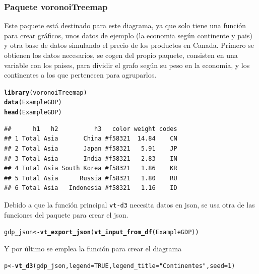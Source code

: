 \documentclass{article}\usepackage[]{graphicx}\usepackage[]{color}
\makeatletter
\newcommand{\hlnum}[1]{\textcolor[rgb]{0.686,0.059,0.569}{#1}}%
\newcommand{\hlstr}[1]{\textcolor[rgb]{0.192,0.494,0.8}{#1}}%
\newcommand{\hlstd}[1]{\textcolor[rgb]{0.345,0.345,0.345}{#1}}%
\newcommand{\hlkwb}[1]{\textcolor[rgb]{0.69,0.353,0.396}{#1}}%
\newcommand{\hlkwc}[1]{\textcolor[rgb]{0.333,0.667,0.333}{#1}}%
\newcommand{\hlkwd}[1]{\textcolor[rgb]{0.737,0.353,0.396}{\textbf{#1}}}%
\newenvironment{kframe}{%
 \def\at@end@of@kframe{}%
 \ifinner\ifhmode%
  \def\at@end@of@kframe{\end{minipage}}%
  \begin{minipage}{\columnwidth}%
 \fi\fi%
 \def\FrameCommand##1{\hskip\@totalleftmargin \hskip-\fboxsep
 \colorbox{shadecolor}{##1}\hskip-\fboxsep
     \hskip-\linewidth \hskip-\@totalleftmargin \hskip\columnwidth}%
 \MakeFramed {\advance\hsize-\width
   \@totalleftmargin\z@ \linewidth\hsize
   \@setminipage}}%
 {\par\unskip\endMakeFramed%
 \at@end@of@kframe}
\newenvironment{knitrout}{}{} %
\makeatother
\begin{document}
\subsubsection{Paquete voronoiTreemap}
Este paquete \cite{docu_voronoitreemap}
est\'a destinado para este diagrama, ya que solo tiene una funci\'on para crear  gr\'aficos, unos datos de ejemplo (la economia seg\'un continente y pais) y otra base de datos simulando el precio de los productos en Canada.
Primero se obtienen los datos necesarios, se cogen del propio paquete, consisten en una variable con los paises, para dividir el grafo seg\'un su peso en la econom\'ia, y los continentes a los que pertenecen para agruparlos.
\begin{knitrout}
\color{fgcolor}\begin{kframe}
\begin{alltt}
\hlkwd{library}\hlstd{(voronoiTreemap)}
\hlkwd{data}\hlstd{(ExampleGDP)}
\hlkwd{head}\hlstd{(ExampleGDP)}
\end{alltt}
\begin{verbatim}
##      h1   h2          h3   color weight codes
## 1 Total Asia       China #f58321  14.84    CN
## 2 Total Asia       Japan #f58321   5.91    JP
## 3 Total Asia       India #f58321   2.83    IN
## 4 Total Asia South Korea #f58321   1.86    KR
## 5 Total Asia      Russia #f58321   1.80    RU
## 6 Total Asia   Indonesia #f58321   1.16    ID
\end{verbatim}
\end{kframe}
\end{knitrout}
Debido a que la funci\'on principal \texttt{vt-d3} necesita datos en json, se usa otra de las funciones del paquete para crear el json.
\begin{knitrout}
\color{fgcolor}\begin{kframe}
\begin{alltt}
\hlstd{gdp_json} \hlkwb{<-} \hlkwd{vt_export_json}\hlstd{(}\hlkwd{vt_input_from_df}\hlstd{(ExampleGDP))}
\end{alltt}
\end{kframe}
\end{knitrout}
Y por \'ultimo se emplea la funci\'on para crear el diagrama
\begin{knitrout}
\color{fgcolor}\begin{kframe}
\begin{alltt}
\hlstd{p} \hlkwb{<-} \hlkwd{vt_d3}\hlstd{(gdp_json,} \hlkwc{legend} \hlstd{=} \hlnum{TRUE}\hlstd{,} \hlkwc{legend_title} \hlstd{=} \hlstr{"Continentes"}\hlstd{,} \hlkwc{seed} \hlstd{=} \hlnum{1}\hlstd{)}
\end{alltt}
\end{kframe}
\end{knitrout}
\end{document}

